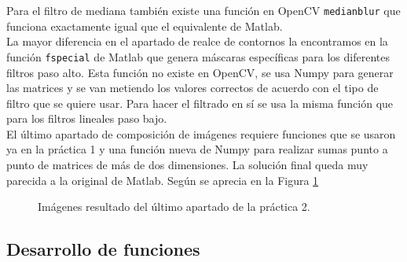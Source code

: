 Para el filtro de mediana también existe una función en OpenCV \texttt{medianblur} que funciona exactamente igual que el equivalente de Matlab.\\

La mayor diferencia en el apartado de realce de contornos la encontramos en la función \texttt{fspecial} de Matlab que genera máscaras específicas para los diferentes filtros paso alto. Esta función no existe en OpenCV, se usa Numpy para generar las matrices y se van metiendo los valores correctos de acuerdo con el tipo de filtro que se quiere usar. Para hacer el filtrado en sí se usa la misma función que para los filtros lineales paso bajo.\\

El último apartado de composición de imágenes requiere funciones que se usaron ya en la práctica 1 y una función nueva de Numpy para realizar sumas punto a punto de matrices de más de dos dimensiones. La solución final queda muy parecida a la original de Matlab. Según se aprecia en la Figura \ref {p2final}\\


\begin{figure}[!tbp]
  \centering
  \hfill
  \caption{Imágenes resultado del último apartado de la práctica 2.}
  \label{p2final}
\end{figure}


\subsection{Desarrollo de funciones}

